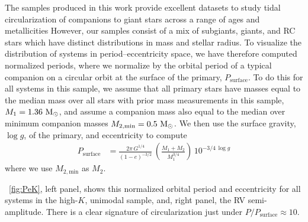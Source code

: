 \documentclass[modern, letterpaper]{aastex62}
\begin{document}
The samples produced in this work provide excellent datasets to study tidal
circularization of companions to giant stars across a range of ages and
metallicities
However, our samples consist of a mix of subgiants, giants, and RC stars which
have distinct distributions in mass and stellar radius.
To visualize the distribution of systems in period--eccentricity space, we have
therefore computed normalized periods, where we normalize by the orbital period
of a typical companion on a circular orbit at the surface of the primary,
$P_{\textrm{surface}}$.
To do this for all systems in this sample, we assume that all primary stars have
masses equal to the median mass over all stars with prior mass measurements in
this sample, $M_1 = 1.36~\mathrm{M}_\odot$, and assume a companion mass also equal to the
median over minimum companion masses $M_{2, \textrm{min}} = 0.5~\mathrm{M}_\odot$.
We then use the surface gravity, $\log g$, of the primary, and eccentricity to
compute
\begin{align}
    P_{\textrm{surface}} &= \frac{2\pi \, G^{1/4}}{(1-e)^{-3/2}} \,
        \left(\frac{M_1 + M_2}{M_1^{3/4}}\right) \,
        10^{-3/4\,\log g}
\end{align}
where we use $M_{2, \textrm{min}}$ as $M_2$.

\figurename~\ref{fig:PeK}, left panel, shows this normalized orbital period and
eccentricity for all systems in the high-$K$, unimodal sample, and, right panel,
the RV semi-amplitude.
There is a clear signature of circularization just under $P/P_{\textrm{surface}}
\approx 10$.
\end{document}

